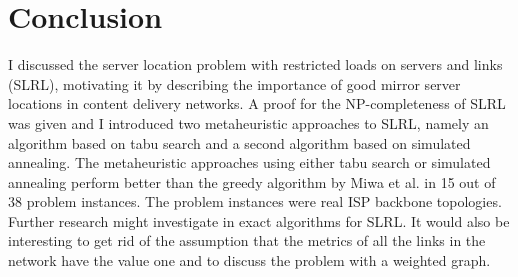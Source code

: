\documentclass [12pt]{article}
\begin{document}
\section{Conclusion}
I discussed the server location problem with restricted loads on servers and links (SLRL), motivating it by describing the importance of good mirror server locations in content delivery networks.
A proof for the NP-completeness of SLRL was given and I introduced two metaheuristic approaches to SLRL, namely an algorithm based on tabu search and a second algorithm 
based on simulated annealing.
The metaheuristic approaches using either tabu search or simulated annealing perform better than the greedy algorithm by Miwa et al. in 15 out of 38 problem instances. The problem instances were
real ISP backbone topologies. Further research might investigate in exact algorithms for SLRL. It would also be interesting to get rid 
of the assumption that the metrics of all the links in the network have the value one and to discuss the problem with a weighted graph.
\newpage

\end{document}
